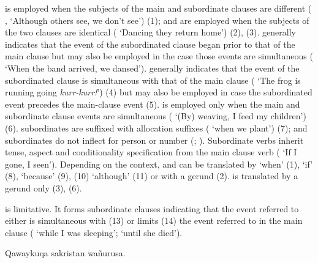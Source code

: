  is employed when the subjects of the main and subordinate clauses are different ( ,   `Although others see, we don't see') (1);  and  are employed when the subjects of the two clauses are identical (   `Dancing they return home') (2), (3).  generally indicates that the event of the subordinated clause began prior to that of the main clause but may also be employed in the case those events are simultaneous (   `When the band arrived, we dansed').  generally indicates that the event of the subordinated clause is simultaneous with that of the main clause (   `The frog is running going \emph{kurr-kurr!}') (4) but may also be employed in case the subordinated event precedes the main-clause event (5).  is employed only when the main and subordinate clause events are simultaneous (   `(By) weaving, I feed my children') (6).  subordinates are suffixed with allocation suffixes ( `when we plant') (7);  and  subordinates do not inflect for person or number (; ). Subordinate verbs inherit tense, aspect and conditionality specification from the main clause verb (  `If I  gone, I  seen'). Depending on the context,  and  can be translated by `when' (1), `if' (8), `because' (9), (10) `although' (11) or with a gerund (2).  is translated by a gerund only (3), (6).

 is limitative. It forms subordinate clauses indicating that the event referred to either is simultaneous with (13) or limits (14) the event referred to in the main clause ( `while I was sleeping';  `until she died').

%
{Qawaykuqa sakristan wa\~nurusa.}%
{}%
{}{}%

